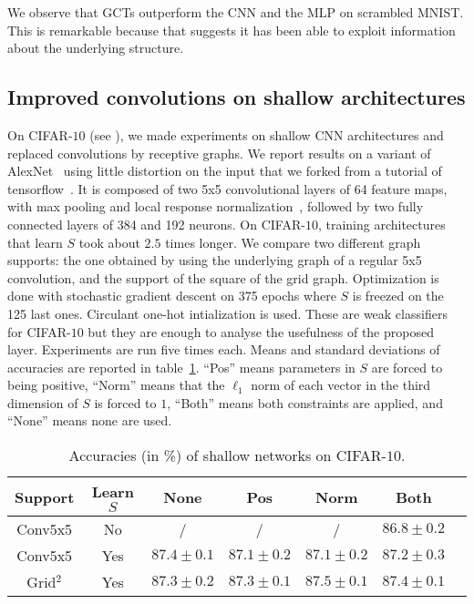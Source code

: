 We observe that GCTs outperform the CNN and the MLP on scrambled MNIST. This is remarkable because that suggests it has been able to exploit information about the underlying structure.

\subsection{Improved convolutions on shallow architectures}

On CIFAR-$10$ (see ), we made experiments on shallow CNN architectures and replaced convolutions by receptive graphs. We report results on a variant of AlexNet~\citep{krizhevsky2012imagenet} using little distortion on the input that we forked from a tutorial of tensorflow~\citep{tensorflow2015-whitepaper}.
It is composed of two 5x5 convolutional layers of 64 feature maps, with max pooling and local response normalization~\citep{krizhevsky2012imagenet}, followed by two fully connected layers of 384 and 192 neurons.
On CIFAR-$10$, training architectures that learn $S$ took about $2.5$ times longer.
We compare two different graph supports: the one obtained by using the underlying graph of a regular 5x5 convolution, and the support of the square of the grid graph. Optimization is done with stochastic gradient descent on 375 epochs where $S$ is freezed on the 125 last ones. Circulant one-hot intialization is used. These are weak classifiers for CIFAR-$10$ but they are enough to analyse the usefulness of the proposed layer.
Experiments are run five times each. Means and standard deviations of accuracies are reported in table~\ref{cifar}. ``Pos'' means parameters in $S$ are forced to being positive, ``Norm'' means that the $\ell_1$ norm of each vector in the third dimension of $S$ is forced to $1$, ``Both'' means both constraints are applied, and ``None'' means none are used.

\begin{table}[H]
  \caption{Accuracies (in \%) of shallow networks on CIFAR-$10$.}
  \begin{center}
    \bgroup
    \def\arraystretch{1.5}%
    \begin{tabular}{|c|c|c|c|c|c|c|}
      \hline
      Support & Learn $S$ & None & Pos & Norm & Both\\
      \hline
      \hline
      Conv5x5 & No & / & / & / & $86.8 \pm 0.2$\\
      \hline
      Conv5x5 & Yes & $87.4 \pm 0.1$ & $87.1 \pm 0.2$ & $87.1 \pm 0.2$ & $87.2 \pm 0.3$\\
      \hline
      Grid$^2$ & Yes & $87.3 \pm 0.2$ & $87.3 \pm 0.1$ & $87.5 \pm 0.1$ & $87.4 \pm 0.1$\\
      \hline
    \end{tabular}
    \egroup
  \end{center}
  \label{cifar}
\end{table}

